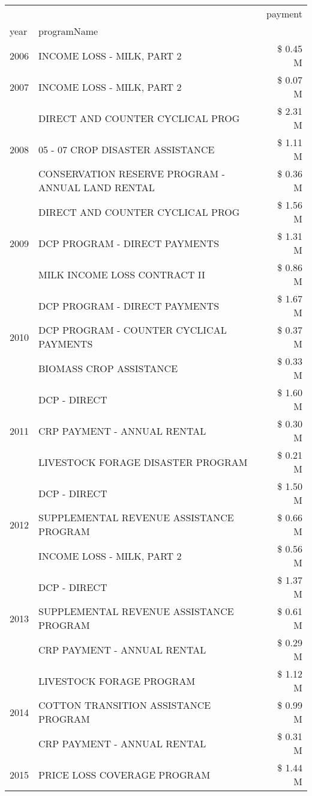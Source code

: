 \begin{tabular}{llr}
\toprule
 &  & payment \\
year & programName &  \\
\midrule
2006 & INCOME LOSS - MILK, PART 2 & \$ 0.45 M \\
\cline{1-3}
2007 & INCOME LOSS - MILK, PART 2 & \$ 0.07 M \\
\cline{1-3}
\multirow[t]{3}{*}{2008} & DIRECT AND COUNTER CYCLICAL PROG & \$ 2.31 M \\
 & 05 - 07 CROP DISASTER ASSISTANCE & \$ 1.11 M \\
 & CONSERVATION RESERVE PROGRAM - ANNUAL LAND RENTAL & \$ 0.36 M \\
\cline{1-3}
\multirow[t]{3}{*}{2009} & DIRECT AND COUNTER CYCLICAL PROG & \$ 1.56 M \\
 & DCP PROGRAM - DIRECT PAYMENTS & \$ 1.31 M \\
 & MILK INCOME LOSS CONTRACT II & \$ 0.86 M \\
\cline{1-3}
\multirow[t]{3}{*}{2010} & DCP PROGRAM - DIRECT PAYMENTS & \$ 1.67 M \\
 & DCP PROGRAM - COUNTER CYCLICAL PAYMENTS & \$ 0.37 M \\
 & BIOMASS CROP ASSISTANCE & \$ 0.33 M \\
\cline{1-3}
\multirow[t]{3}{*}{2011} & DCP - DIRECT & \$ 1.60 M \\
 & CRP PAYMENT - ANNUAL RENTAL & \$ 0.30 M \\
 & LIVESTOCK FORAGE DISASTER PROGRAM & \$ 0.21 M \\
\cline{1-3}
\multirow[t]{3}{*}{2012} & DCP - DIRECT & \$ 1.50 M \\
 & SUPPLEMENTAL REVENUE ASSISTANCE PROGRAM & \$ 0.66 M \\
 & INCOME LOSS - MILK, PART 2 & \$ 0.56 M \\
\cline{1-3}
\multirow[t]{3}{*}{2013} & DCP - DIRECT & \$ 1.37 M \\
 & SUPPLEMENTAL REVENUE ASSISTANCE PROGRAM & \$ 0.61 M \\
 & CRP PAYMENT - ANNUAL RENTAL & \$ 0.29 M \\
\cline{1-3}
\multirow[t]{3}{*}{2014} & LIVESTOCK FORAGE PROGRAM & \$ 1.12 M \\
 & COTTON TRANSITION ASSISTANCE PROGRAM & \$ 0.99 M \\
 & CRP PAYMENT - ANNUAL RENTAL & \$ 0.31 M \\
\cline{1-3}
\multirow[t]{3}{*}{2015} & PRICE LOSS COVERAGE PROGRAM & \$ 1.44 M \\

\end{tabular}
